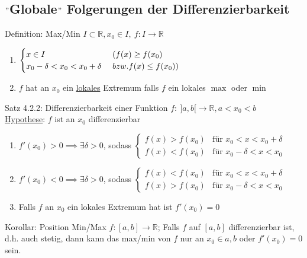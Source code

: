 \documentclass[a4paper,10pt]{article}
\begin{document}
\subsection{$"$Globale$"$ Folgerungen der Differenzierbarkeit}
\begin{defbox}
    {Definition: Max/Min}
    $I\subset \mathbb R, x_0\in I,\ f:I\longrightarrow \mathbb R$
    \begin{enumerate}
        \item $\begin{cases}x\in I &\  \space (f(x)\ge f(x_0)\\ x_0 -\delta <x_0 <x_0 + \delta &\ bzw. \space f(x)\le f(x_0))\end{cases}$
        \item $f$ hat an $x_0$ ein \underline{lokales} Extremum falls $f$ ein lokales \underline{$\max$} oder \underline{$\min$}
    \end{enumerate}
\end{defbox}
\begin{tbox}
    {Satz 4.2.2: Differenzierbarkeit einer Funktion}
    $f:\ ]a,b[\longrightarrow\mathbb R, a<x_0<b$
    \\ \underline{Hypothese}: $f$ ist an $x_0$ differenzierbar
    \begin{enumerate}
        \item $f'(x_0)>0\implies\exists \delta>0$, sodass 
        $
        \begin{cases}
            f(x)>f(x_0) & \text{für } x_0<x<x_0+\delta
            \\ f(x)<f(x_0) & \text{für } x_0-\delta<x<x_0
        \end{cases}
        $
        \item $f'(x_0)<0\implies\exists \delta>0$, sodass
         $
        \begin{cases}
            f(x)<f(x_0) & \text{für } x_0<x<x_0+\delta
            \\ f(x)>f(x_0) & \text{für } x_0-\delta<x<x_0
        \end{cases}
        $
        \item Falls $f$ an $x_0$ ein lokales Extremum hat ist $f'(x_0)=0$
    \end{enumerate}
\end{tbox}
\begin{tbox}
    {Korollar: Position Min/Max}
    $f: [a,b]\longrightarrow \mathbb R$; Falls $f$ auf $[a,b]$ differenzierbar ist, d.h. auch stetig, dann kann das max/min von $f$ nur an $x_0\in{a,b}$ oder $f'(x_0)=0$ sein.
\end{tbox}
\end{document}
